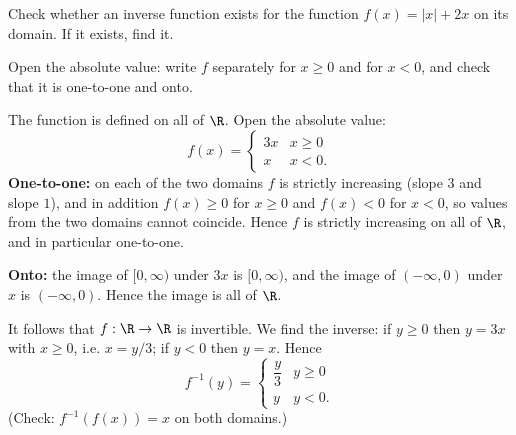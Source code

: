 
\begin{question}
Check whether an inverse function exists for the function $f(x)=|x|+2x$ on its domain. If it exists, find it.
\end{question}

\begin{hint}
Open the absolute value: write $f$ separately for $x\ge 0$ and for $x<0$, and check that it is one-to-one and onto.
\end{hint}

\begin{solution}
The function is defined on all of $\R$. Open the absolute value:
\[ f(x)=\begin{cases} 3x & x\ge 0\\ x & x<0. \end{cases} \]
\textbf{One-to-one:} on each of the two domains $f$ is strictly increasing (slope $3$ and slope $1$), and in addition $f(x)\ge 0$ for $x\ge0$ and $f(x)<0$ for $x<0$, so values from the two domains cannot coincide. Hence $f$ is strictly increasing on all of $\R$, and in particular one-to-one.

\textbf{Onto:} the image of $[0,\infty)$ under $3x$ is $[0,\infty)$, and the image of $(-\infty,0)$ under $x$ is $(-\infty,0)$. Hence the image is all of $\R$.

It follows that $f:\R\to\R$ is invertible. We find the inverse: if $y\ge 0$ then $y=3x$ with $x\ge 0$, i.e. $x=y/3$; if $y<0$ then $y=x$. Hence
\[ \boxed{f^{-1}(y)=\begin{cases} \dfrac{y}{3} & y\ge 0\\[2mm] y & y<0. \end{cases}} \]
(Check: $f^{-1}(f(x))=x$ on both domains.)
\end{solution}
